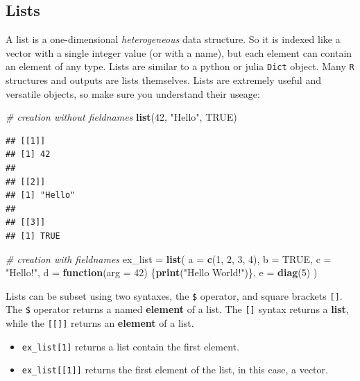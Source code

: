 \documentclass[]{book}
\newenvironment{Shaded}{\begin{snugshade}}{\end{snugshade}}
\newcommand{\KeywordTok}[1]{\textcolor[rgb]{0.13,0.29,0.53}{\textbf{#1}}}
\newcommand{\DataTypeTok}[1]{\textcolor[rgb]{0.13,0.29,0.53}{#1}}
\newcommand{\DecValTok}[1]{\textcolor[rgb]{0.00,0.00,0.81}{#1}}
\newcommand{\StringTok}[1]{\textcolor[rgb]{0.31,0.60,0.02}{#1}}
\newcommand{\CommentTok}[1]{\textcolor[rgb]{0.56,0.35,0.01}{\textit{#1}}}
\newcommand{\OtherTok}[1]{\textcolor[rgb]{0.56,0.35,0.01}{#1}}
\newcommand{\ControlFlowTok}[1]{\textcolor[rgb]{0.13,0.29,0.53}{\textbf{#1}}}
\newcommand{\NormalTok}[1]{#1}
\providecommand{\tightlist}{%
  \setlength{\itemsep}{0pt}\setlength{\parskip}{0pt}}
\begin{document}
\subsection{Lists}\label{lists}

A list is a one-dimensional \emph{heterogeneous} data structure. So it
is indexed like a vector with a single integer value (or with a name),
but each element can contain an element of any type. Lists are similar
to a python or julia \texttt{Dict} object. Many \texttt{R} structures
and outputs are lists themselves. Lists are extremely useful and
versatile objects, so make sure you understand their useage:

\begin{Shaded}
\begin{Highlighting}[]
\CommentTok{# creation without fieldnames}
\KeywordTok{list}\NormalTok{(}\DecValTok{42}\NormalTok{, }\StringTok{"Hello"}\NormalTok{, }\OtherTok{TRUE}\NormalTok{)}
\end{Highlighting}
\end{Shaded}

\begin{verbatim}
## [[1]]
## [1] 42
## 
## [[2]]
## [1] "Hello"
## 
## [[3]]
## [1] TRUE
\end{verbatim}

\begin{Shaded}
\begin{Highlighting}[]
\CommentTok{# creation with fieldnames}
\NormalTok{ex_list =}\StringTok{ }\KeywordTok{list}\NormalTok{(}
  \DataTypeTok{a =} \KeywordTok{c}\NormalTok{(}\DecValTok{1}\NormalTok{, }\DecValTok{2}\NormalTok{, }\DecValTok{3}\NormalTok{, }\DecValTok{4}\NormalTok{),}
  \DataTypeTok{b =} \OtherTok{TRUE}\NormalTok{,}
  \DataTypeTok{c =} \StringTok{"Hello!"}\NormalTok{,}
  \DataTypeTok{d =} \ControlFlowTok{function}\NormalTok{(}\DataTypeTok{arg =} \DecValTok{42}\NormalTok{) \{}\KeywordTok{print}\NormalTok{(}\StringTok{"Hello World!"}\NormalTok{)\},}
  \DataTypeTok{e =} \KeywordTok{diag}\NormalTok{(}\DecValTok{5}\NormalTok{)}
\NormalTok{)}
\end{Highlighting}
\end{Shaded}

Lists can be subset using two syntaxes, the \texttt{\$} operator, and
square brackets \texttt{{[}{]}}. The \texttt{\$} operator returns a
named \textbf{element} of a list. The \texttt{{[}{]}} syntax returns a
\textbf{list}, while the \texttt{{[}{[}{]}{]}} returns an
\textbf{element} of a list.

\begin{itemize}
\tightlist
\item
  \texttt{ex\_list{[}1{]}} returns a list contain the first element.
\item
  \texttt{ex\_list{[}{[}1{]}{]}} returns the first element of the list,
  in this case, a vector.
\end{itemize}
\end{document}
